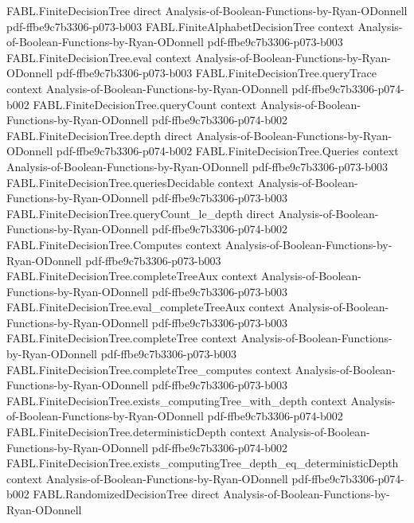 \begin{theorem}
\proofstep
  {FABL.FiniteDecisionTree}
  {direct}
  {Analysis-of-Boolean-Functions-by-Ryan-ODonnell}
  {pdf-ffbe9c7b3306-p073-b003}
\proofstep
  {FABL.FiniteAlphabetDecisionTree}
  {context}
  {Analysis-of-Boolean-Functions-by-Ryan-ODonnell}
  {pdf-ffbe9c7b3306-p073-b003}
\proofstep
  {FABL.FiniteDecisionTree.eval}
  {context}
  {Analysis-of-Boolean-Functions-by-Ryan-ODonnell}
  {pdf-ffbe9c7b3306-p073-b003}
\proofstep
  {FABL.FiniteDecisionTree.queryTrace}
  {context}
  {Analysis-of-Boolean-Functions-by-Ryan-ODonnell}
  {pdf-ffbe9c7b3306-p074-b002}
\proofstep
  {FABL.FiniteDecisionTree.queryCount}
  {context}
  {Analysis-of-Boolean-Functions-by-Ryan-ODonnell}
  {pdf-ffbe9c7b3306-p074-b002}
\proofstep
  {FABL.FiniteDecisionTree.depth}
  {direct}
  {Analysis-of-Boolean-Functions-by-Ryan-ODonnell}
  {pdf-ffbe9c7b3306-p074-b002}
\proofstep
  {FABL.FiniteDecisionTree.Queries}
  {context}
  {Analysis-of-Boolean-Functions-by-Ryan-ODonnell}
  {pdf-ffbe9c7b3306-p073-b003}
\proofstep
  {FABL.FiniteDecisionTree.queriesDecidable}
  {context}
  {Analysis-of-Boolean-Functions-by-Ryan-ODonnell}
  {pdf-ffbe9c7b3306-p073-b003}
\proofstep
  {FABL.FiniteDecisionTree.queryCount_le_depth}
  {direct}
  {Analysis-of-Boolean-Functions-by-Ryan-ODonnell}
  {pdf-ffbe9c7b3306-p074-b002}
\proofstep
  {FABL.FiniteDecisionTree.Computes}
  {context}
  {Analysis-of-Boolean-Functions-by-Ryan-ODonnell}
  {pdf-ffbe9c7b3306-p073-b003}
\proofstep
  {FABL.FiniteDecisionTree.completeTreeAux}
  {context}
  {Analysis-of-Boolean-Functions-by-Ryan-ODonnell}
  {pdf-ffbe9c7b3306-p073-b003}
\proofstep
  {FABL.FiniteDecisionTree.eval_completeTreeAux}
  {context}
  {Analysis-of-Boolean-Functions-by-Ryan-ODonnell}
  {pdf-ffbe9c7b3306-p073-b003}
\proofstep
  {FABL.FiniteDecisionTree.completeTree}
  {context}
  {Analysis-of-Boolean-Functions-by-Ryan-ODonnell}
  {pdf-ffbe9c7b3306-p073-b003}
\proofstep
  {FABL.FiniteDecisionTree.completeTree_computes}
  {context}
  {Analysis-of-Boolean-Functions-by-Ryan-ODonnell}
  {pdf-ffbe9c7b3306-p073-b003}
\proofstep
  {FABL.FiniteDecisionTree.exists_computingTree_with_depth}
  {context}
  {Analysis-of-Boolean-Functions-by-Ryan-ODonnell}
  {pdf-ffbe9c7b3306-p074-b002}
\proofstep
  {FABL.FiniteDecisionTree.deterministicDepth}
  {context}
  {Analysis-of-Boolean-Functions-by-Ryan-ODonnell}
  {pdf-ffbe9c7b3306-p074-b002}
\proofstep
  {FABL.FiniteDecisionTree.exists_computingTree_depth_eq_deterministicDepth}
  {context}
  {Analysis-of-Boolean-Functions-by-Ryan-ODonnell}
  {pdf-ffbe9c7b3306-p074-b002}
\proofstep
  {FABL.RandomizedDecisionTree}
  {direct}
  {Analysis-of-Boolean-Functions-by-Ryan-ODonnell}

\end{theorem}
